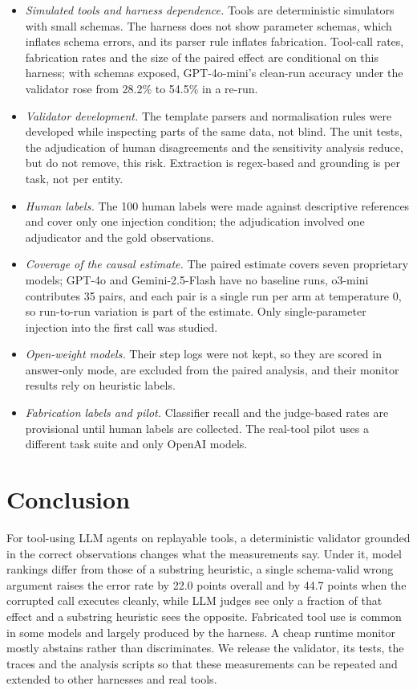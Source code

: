 \documentclass[pdflatex,sn-mathphys-num,Numbered]{sn-jnl}
\begin{document}
\begin{itemize}
\item \emph{Simulated tools and harness dependence.} Tools are deterministic simulators with small schemas. The harness does not show parameter schemas, which inflates schema errors, and its parser rule inflates fabrication. Tool-call rates, fabrication rates and the size of the paired effect are conditional on this harness; with schemas exposed, GPT-4o-mini's clean-run accuracy under the validator rose from 28.2\% to 54.5\% in a re-run.
\item \emph{Validator development.} The template parsers and normalisation rules were developed while inspecting parts of the same data, not blind. The unit tests, the adjudication of human disagreements and the sensitivity analysis reduce, but do not remove, this risk. Extraction is regex-based and grounding is per task, not per entity.
\item \emph{Human labels.} The 100 human labels were made against descriptive references and cover only one injection condition; the adjudication involved one adjudicator and the gold observations.
\item \emph{Coverage of the causal estimate.} The paired estimate covers seven proprietary models; GPT-4o and Gemini-2.5-Flash have no baseline runs, o3-mini contributes 35 pairs, and each pair is a single run per arm at temperature 0, so run-to-run variation is part of the estimate. Only single-parameter injection into the first call was studied.
\item \emph{Open-weight models.} Their step logs were not kept, so they are scored in answer-only mode, are excluded from the paired analysis, and their monitor results rely on heuristic labels.
\item \emph{Fabrication labels and pilot.} Classifier recall and the judge-based rates are provisional until human labels are collected. The real-tool pilot uses a different task suite and only OpenAI models.
\end{itemize}

\section{Conclusion}\label{sec:conclusion}

For tool-using LLM agents on replayable tools, a deterministic validator grounded in the correct observations changes what the measurements say. Under it, model rankings differ from those of a substring heuristic, a single schema-valid wrong argument raises the error rate by 22.0 points overall and by 44.7 points when the corrupted call executes cleanly, while LLM judges see only a fraction of that effect and a substring heuristic sees the opposite. Fabricated tool use is common in some models and largely produced by the harness. A cheap runtime monitor mostly abstains rather than discriminates. We release the validator, its tests, the traces and the analysis scripts so that these measurements can be repeated and extended to other harnesses and real tools.
\end{document}
